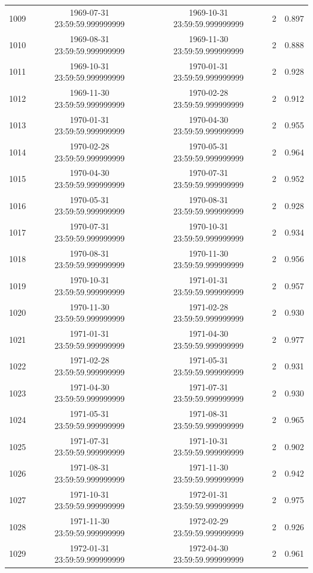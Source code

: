 \begin{table}
\begin{tabular}{lcccc}
1009 & 1969-07-31 23:59:59.999999999 & 1969-10-31 23:59:59.999999999 & 2 & 0.897 \\
1010 & 1969-08-31 23:59:59.999999999 & 1969-11-30 23:59:59.999999999 & 2 & 0.888 \\
1011 & 1969-10-31 23:59:59.999999999 & 1970-01-31 23:59:59.999999999 & 2 & 0.928 \\
1012 & 1969-11-30 23:59:59.999999999 & 1970-02-28 23:59:59.999999999 & 2 & 0.912 \\
1013 & 1970-01-31 23:59:59.999999999 & 1970-04-30 23:59:59.999999999 & 2 & 0.955 \\
1014 & 1970-02-28 23:59:59.999999999 & 1970-05-31 23:59:59.999999999 & 2 & 0.964 \\
1015 & 1970-04-30 23:59:59.999999999 & 1970-07-31 23:59:59.999999999 & 2 & 0.952 \\
1016 & 1970-05-31 23:59:59.999999999 & 1970-08-31 23:59:59.999999999 & 2 & 0.928 \\
1017 & 1970-07-31 23:59:59.999999999 & 1970-10-31 23:59:59.999999999 & 2 & 0.934 \\
1018 & 1970-08-31 23:59:59.999999999 & 1970-11-30 23:59:59.999999999 & 2 & 0.956 \\
1019 & 1970-10-31 23:59:59.999999999 & 1971-01-31 23:59:59.999999999 & 2 & 0.957 \\
1020 & 1970-11-30 23:59:59.999999999 & 1971-02-28 23:59:59.999999999 & 2 & 0.930 \\
1021 & 1971-01-31 23:59:59.999999999 & 1971-04-30 23:59:59.999999999 & 2 & 0.977 \\
1022 & 1971-02-28 23:59:59.999999999 & 1971-05-31 23:59:59.999999999 & 2 & 0.931 \\
1023 & 1971-04-30 23:59:59.999999999 & 1971-07-31 23:59:59.999999999 & 2 & 0.930 \\
1024 & 1971-05-31 23:59:59.999999999 & 1971-08-31 23:59:59.999999999 & 2 & 0.965 \\
1025 & 1971-07-31 23:59:59.999999999 & 1971-10-31 23:59:59.999999999 & 2 & 0.902 \\
1026 & 1971-08-31 23:59:59.999999999 & 1971-11-30 23:59:59.999999999 & 2 & 0.942 \\
1027 & 1971-10-31 23:59:59.999999999 & 1972-01-31 23:59:59.999999999 & 2 & 0.975 \\
1028 & 1971-11-30 23:59:59.999999999 & 1972-02-29 23:59:59.999999999 & 2 & 0.926 \\
1029 & 1972-01-31 23:59:59.999999999 & 1972-04-30 23:59:59.999999999 & 2 & 0.961 \\

\end{tabular}
\end{table}
